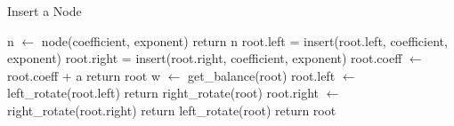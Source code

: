 \begin{algorithm}[H]
    \caption{Insert a Node} \label{insert_node}
    \begin{algorithmic}
    \State n $\gets$ node(coefficient, exponent)
        \State return n
    \EndIf
        \State root.left = insert(root.left, coefficient, exponent)
        \State root.right = insert(root.right, coefficient, exponent)
    \Else 
        \State root.coeff $\gets$ root.coeff + a
        \State return root
    \EndIf
    \State w $\gets$ get\_balance(root)
            \State root.left $\gets$ left\_rotate(root.left)
         \EndIf
         \State return right\_rotate(root)
            \State root.right $\gets$ right\_rotate(root.right)
         \EndIf
         \State return left\_rotate(root)
    \EndIf
    \State return root
    \EndProcedure
\end{algorithmic}

\end{algorithm}